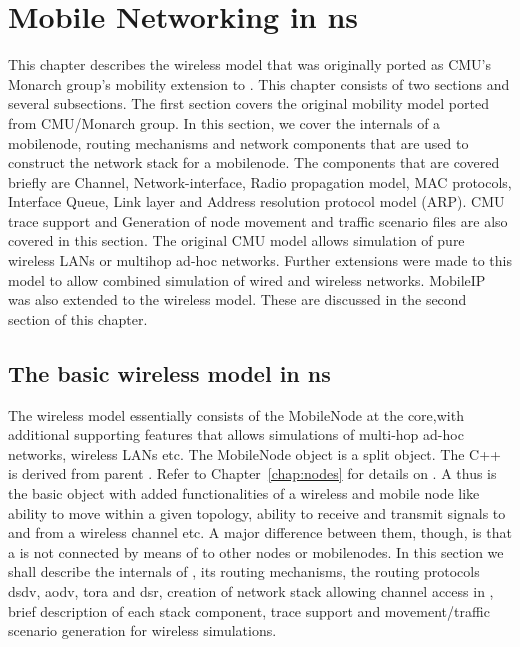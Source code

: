 %
\chapter{Mobile Networking in ns}
\label{chap:mobility}

This chapter describes the wireless model that was originally ported as CMU's Monarch group's mobility extension to \ns. 
This chapter consists of two sections and several subsections. The
first section covers the original mobility model ported from
CMU/Monarch group. In this section, we cover the internals of a
mobilenode, routing mechanisms and network components that are used to
construct the network stack for a mobilenode. The components that are
covered briefly are Channel, Network-interface, Radio propagation
model, MAC protocols, Interface Queue, Link layer and Address
resolution protocol model (ARP). CMU trace support and Generation of
node movement and traffic scenario files are also covered in this
section. 
The original CMU model allows simulation of pure wireless LANs or
multihop ad-hoc networks. Further extensions were made to this model
to allow combined simulation of wired and wireless networks. MobileIP
was also extended to the wireless model. These are
discussed in the second section of this chapter.                


\section{The basic wireless model in ns}
\label{sec:basic-model}

The wireless model essentially consists of the MobileNode at the core,with
additional supporting features that allows simulations of multi-hop ad-hoc
networks, wireless LANs etc. The MobileNode object is a split object. The
C++  is derived from parent
. Refer to Chapter~\ref{chap:nodes} for
details on . A  thus is the basic 
object with added functionalities of a wireless and mobile node like
ability to move within a given topology, ability to receive and transmit
signals to and from a wireless channel etc. A major difference between
them, though, is that a  is not connected by means of
 to other nodes or mobilenodes. In this section we shall
describe the internals of , its routing mechanisms, the
routing protocols dsdv, aodv, tora and dsr, creation of network stack
allowing channel
access in , brief description of each stack component,
trace support and movement/traffic scenario generation for wireless
simulations. 


